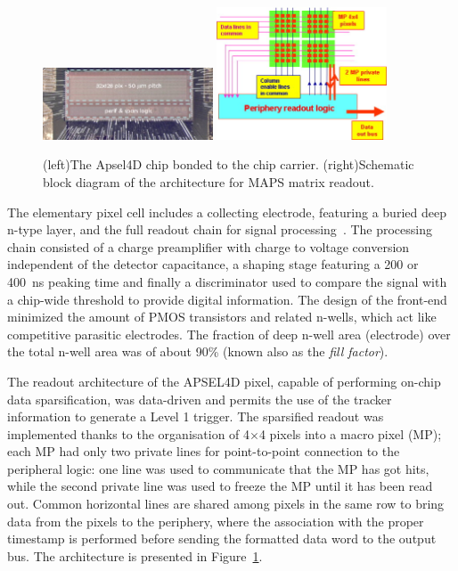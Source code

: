 \begin{figure}[!htpb]
\centering
\includegraphics[width=0.45\textwidth]{Apsel.jpg}
\includegraphics[width=0.45\textwidth]{Apselro.jpg}
\caption{\label{fig:apsel}(left)The Apsel4D chip bonded to the chip carrier. (right)Schematic block diagram of the architecture for MAPS matrix readout.}
\end{figure}

The elementary pixel cell includes a collecting electrode, featuring a buried deep n-type layer, and the full readout chain for signal processing~\cite{Ratti:2006zz}. The processing chain consisted of a charge 
preamplifier with charge to voltage conversion independent of the detector capacitance, a shaping 
stage featuring a 200 or 400~ns peaking time and finally a discriminator used to compare the signal with a chip-wide threshold to provide digital information. 
The design of the front-end minimized the amount of PMOS transistors and related n-wells, which act 
like competitive parasitic electrodes. The fraction of deep n-well area (electrode) over the total n-well 
area was of about 90\% (known also as the {\it fill factor}). 



The readout architecture of the APSEL4D pixel, capable of performing on-chip data sparsification, was 
data-driven and permits the use of the tracker information to generate a Level 1 trigger. 
The sparsified readout was implemented thanks to the organisation of 4$\times$4 pixels into a macro 
pixel (MP); each MP had only two private lines for point-to-point connection to the peripheral logic:
one line was used to communicate that the MP has got hits, while the second private line was used to 
freeze the MP until it has been read out.  Common horizontal lines are shared among pixels in the 
same row to bring data from the pixels to the periphery, where the association with the proper 
timestamp is performed before sending the formatted data word to the output bus. The architecture is 
presented in Figure~\ref{fig:apsel}.

